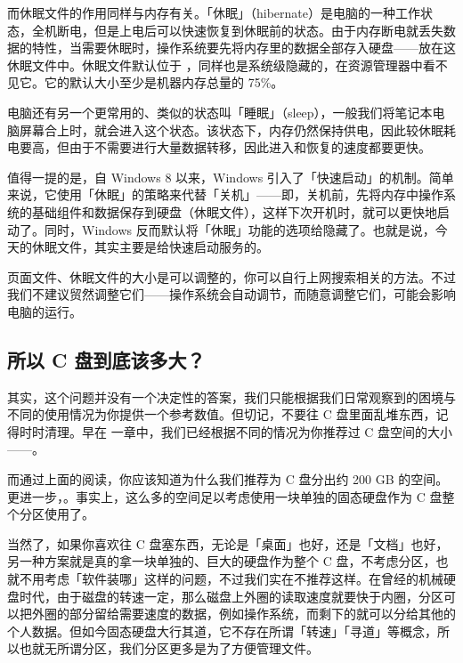 {而休眠文件的作用同样与内存有关。「休眠」（hibernate）是电脑的一种工作状态，全机断电，但是上电后可以快速恢复到休眠前的状态。由于内存断电就丢失数据的特性，当需要休眠时，操作系统要先将内存里的数据全部存入硬盘——放在这休眠文件中。休眠文件默认位于 ，同样也是系统级隐藏的，在资源管理器中看不见它。它的默认大小至少是机器内存总量的 75\%。

\begin{note}
  电脑还有另一个更常用的、类似的状态叫「睡眠」（sleep），一般我们将笔记本电脑屏幕合上时，就会进入这个状态。该状态下，内存仍然保持供电，因此较休眠耗电要高，但由于不需要进行大量数据转移，因此进入和恢复的速度都要更快。
\end{note}

值得一提的是，自 Windows 8 以来，Windows 引入了「快速启动」的机制。简单来说，它使用「休眠」的策略来代替「关机」——即，关机前，先将内存中操作系统的基础组件和数据保存到硬盘（休眠文件），这样下次开机时，就可以更快地启动了。同时，Windows 反而默认将「休眠」功能的选项给隐藏了。也就是说，今天的休眠文件，其实主要是给快速启动服务的。

页面文件、休眠文件的大小是可以调整的，你可以自行上网搜索相关的方法。不过我们不建议贸然调整它们——操作系统会自动调节，而随意调整它们，可能会影响电脑的运行。

\subsection{所以 C 盘到底该多大？}

其实，这个问题并没有一个决定性的答案，我们只能根据我们日常观察到的困境与不同的使用情况为你提供一个参考数值。但切记，不要往 C 盘里面乱堆东西，记得时时清理。早在 一章中，我们已经根据不同的情况为你推荐过 C 盘空间的大小——。

而通过上面的阅读，你应该知道为什么我们推荐为 C 盘分出约 200 GB 的空间。更进一步，。事实上，这么多的空间足以考虑使用一块单独的固态硬盘作为 C 盘整个分区使用了。

\begin{note}
  当然了，如果你喜欢往 C 盘塞东西，无论是「桌面」也好，还是「文档」也好，另一种方案就是真的拿一块单独的、巨大的硬盘作为整个 C 盘，不考虑分区，也就不用考虑「软件装哪」这样的问题，不过我们实在不推荐这样。在曾经的机械硬盘时代，由于磁盘的转速一定，那么磁盘上外圈的读取速度就要快于内圈，分区可以把外圈的部分留给需要速度的数据，例如操作系统，而剩下的就可以分给其他的个人数据。但如今固态硬盘大行其道，它不存在所谓「转速」「寻道」等概念，所以也就无所谓分区，我们分区更多是为了方便管理文件。
\end{note}

}
